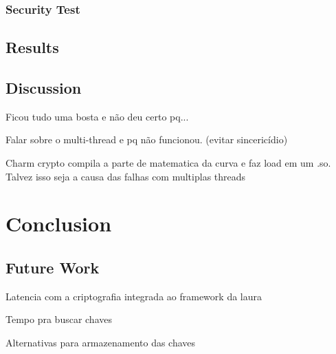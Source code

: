 \documentclass[cic,tc,english]{iiufrgs}
\begin{document}
        

        \subsection{Security Test}
            \label{sec:securitytest}

    \section{Results}
        \label{sec:results}

    \section{Discussion}
        \label{sec:discussion}
        Ficou tudo uma bosta e não deu certo pq...

        Falar sobre o multi-thread e pq não funcionou. (evitar sincericídio)

        Charm crypto compila a parte de matematica da curva e faz load em um .so. Talvez isso seja a causa das falhas com multiplas threads


\chapter{Conclusion}
    \label{chap:conclusion}

    \section{Future Work}
        \label{sec:futurework}
        Latencia com a criptografia integrada ao framework da laura

        Tempo pra buscar chaves

        Alternativas para armazenamento das chaves




\end{document}
